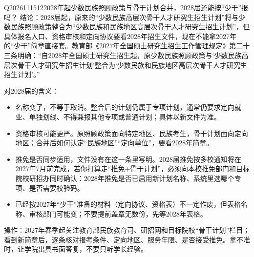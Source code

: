 \begin{qa}{Q2026111512}{2028年起少数民族照顾政策与骨干计划合并，2028届还能按“少干”报吗？}
结论：2028届起，原来的“少数民族高层次骨干人才研究生招生计划”将与少数民族照顾政策整合为“少数民族和民族地区高层次骨干人才研究生招生计划”，但具体报名入口、资格审核和定向协议要看2028年招生文件，现在不能拿2027年的“少干”简章直接套。教育部《2027年全国硕士研究生招生工作管理规定》第二十三条明确：“自2028年全国硕士研究生招生起，原少数民族照顾政策与‘少数民族高层次骨干人才研究生招生计划’整合为‘少数民族和民族地区高层次骨干人才研究生招生计划’。”

对2028届的含义：

\begin{itemize}
\item 名称变了，不等于取消。整合后的计划仍属于专项计划，通常仍要求定向就业、单独划线、不得兼报其他专项或普通计划；具体以新文件为准。
\item 资格审核可能更严。原照顾政策面向特定地区、民族考生，骨干计划面向定向地区；合并后如何认定“民族地区”“定向单位”，要看2028年简章。
\item 推免是否同步适用，文件没有在这一条里写明。2028届推免按多校通知将在2027年7月前完成，若你打算走“推免+骨干计划”，必须向本校推免部门和目标院校研招办同时确认：2028年推免是否已启用新计划名称、系统里选哪个专项、是否需要校验码。
\item 已经按2027年“少干”准备的材料（定向协议、资格表）不一定作废，但表格名称、审核部门可能变；不要提前盖章无数份，先等2028年表格。
\end{itemize}

操作：2027年春季起关注教育部民族教育司、研招网和目标院校“骨干计划”栏目；看到新简章后，逐条核对报考条件、定向地区、服务年限、是否接受推免。拿不准时，让学院出具书面答复，不要只听学长经验。
\end{qa}
